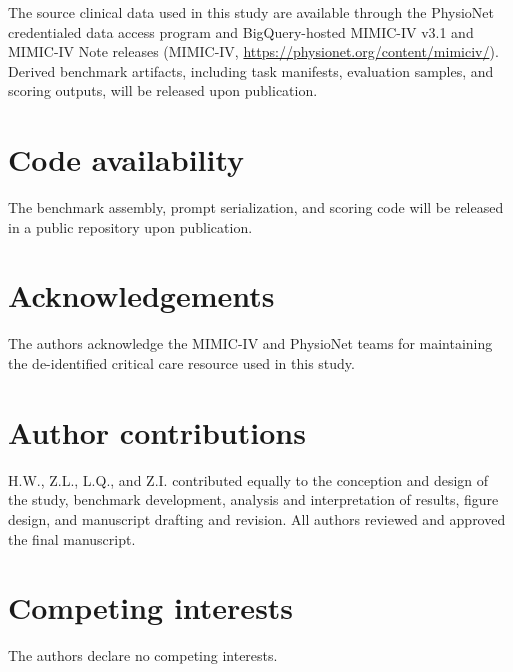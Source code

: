 \documentclass[pdflatex,sn-nature]{sn-jnl}
\begin{document}
The source clinical data used in this study are available through the PhysioNet credentialed data access program and BigQuery-hosted MIMIC-IV v3.1 and MIMIC-IV Note releases (MIMIC-IV, \url{https://physionet.org/content/mimiciv/}). Derived benchmark artifacts, including task manifests, evaluation samples, and scoring outputs, will be released upon publication.

\section*{Code availability}

The benchmark assembly, prompt serialization, and scoring code will be released in a public repository upon publication.

\section*{Acknowledgements}

The authors acknowledge the MIMIC-IV and PhysioNet teams for maintaining the de-identified critical care resource used in this study.

\section*{Author contributions}

H.W., Z.L., L.Q., and Z.I. contributed equally to the conception and design of the study, benchmark development, analysis and interpretation of results, figure design, and manuscript drafting and revision. All authors reviewed and approved the final manuscript.

\section*{Competing interests}

The authors declare no competing interests.


\end{document}
